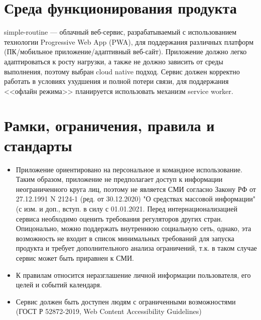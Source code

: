 \section{Среда функционирования продукта}
simple-routine --- облачный веб-сервис, разрабатываемый с использованием технологии Progressive Web App (PWA), для поддержания различных платформ (ПК/мобильное приложение/адаптивный веб-сайт). Приложение должно легко адаптироваться к росту нагрузки, а также не должно зависить от среды выполнения, поэтому выбран cloud native подход. Сервис должен корректно работать в условиях ухудшения и полной потери связи, для поддержания <<офлайн режима>> планируется использовать механизм service worker.

\section{Рамки, ограничения, правила и стандарты}
\begin{itemize}
    \item Приложение ориентировано на персональное и командное использование. Таким образом, приложение не предполагает доступ к информации неограниченного круга лиц, поэтому не является СМИ согласно Закону РФ от 27.12.1991 N 2124-1 (ред. от 30.12.2020) "О средствах массовой информации" (с изм. и доп., вступ. в силу с 01.01.2021. Перед интернационализацией сервиса необходимо оценить требования регуляторов других стран. Опицонально, можно поддержать внутреннюю социальную сеть, однако, эта возможность не входит в список минимальных требований для запуска продукта и требует дополнительного анализа ограничений, т.к. в таком случае сервис может быть приравнен к СМИ.
    \item К правилам относится неразглашение личной информации пользователя, его целей и событий календаря. 
    \item Сервис должен быть доступен людям с ограниченными возможностями (ГОСТ Р 52872-2019, Web Content Accessibility Guidelines)
\end{itemize}
